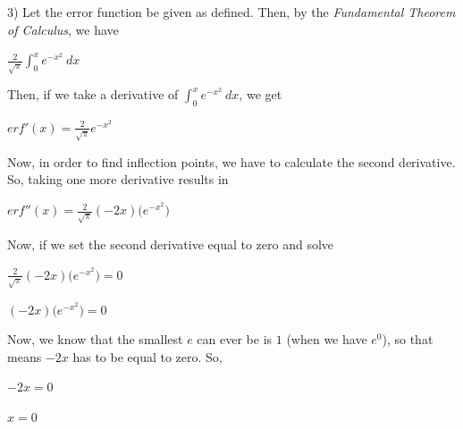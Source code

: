 \documentclass[12pt, executivepaper]{article}
\begin{document}
\begin{flushleft}

3) Let the error function be given as defined. Then, by the \textit{Fundamental Theorem of Calculus}, we have

\begin{center}

$\frac{2}{\sqrt{\pi}} \int_{0}^{x} e^{-x^{2}} \ dx$

\end{center}

Then, if we take a derivative of $ \int_{0}^{x} e^{-x^{2}} \ dx$, we get

\pagebreak

\vspace*{-40mm}

\begin{center}

$erf'(x)=\frac{2}{\sqrt{\pi}} e^{-x^{2}}$

\end{center}

Now, in order to find inflection points, we have to calculate the second derivative. So, taking one more derivative results in

\begin{center}

$erf''(x)=\frac{2}{\sqrt{\pi}}(-2x)\bigg(e^{-x^{2}}\bigg)$

\end{center}

Now, if we set the second derivative equal to zero and solve

\begin{center}

$\frac{2}{\sqrt{\pi}}(-2x)\bigg(e^{-x^{2}}\bigg)=0$

\vspace{2mm}

$(-2x)\bigg(e^{-x^{2}}\bigg)=0$

\end{center}

Now, we know that the smallest $e$ can ever be is $1$ (when we have $e^{0}$), so that means $-2x$ has to be equal to zero. So,

\begin{center}

$-2x=0$

\vspace{2mm}

$x=0$

\end{center}


\end{flushleft}
\end{document}
